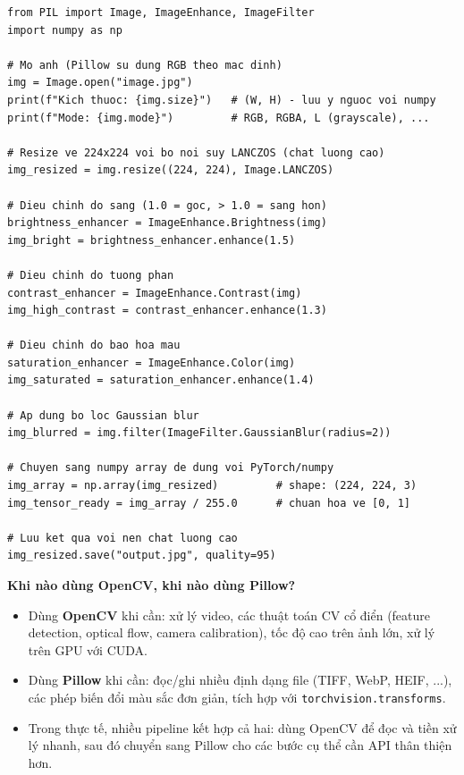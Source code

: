 \begin{verbatim}
from PIL import Image, ImageEnhance, ImageFilter
import numpy as np

# Mo anh (Pillow su dung RGB theo mac dinh)
img = Image.open("image.jpg")
print(f"Kich thuoc: {img.size}")   # (W, H) - luu y nguoc voi numpy
print(f"Mode: {img.mode}")         # RGB, RGBA, L (grayscale), ...

# Resize ve 224x224 voi bo noi suy LANCZOS (chat luong cao)
img_resized = img.resize((224, 224), Image.LANCZOS)

# Dieu chinh do sang (1.0 = goc, > 1.0 = sang hon)
brightness_enhancer = ImageEnhance.Brightness(img)
img_bright = brightness_enhancer.enhance(1.5)

# Dieu chinh do tuong phan
contrast_enhancer = ImageEnhance.Contrast(img)
img_high_contrast = contrast_enhancer.enhance(1.3)

# Dieu chinh do bao hoa mau
saturation_enhancer = ImageEnhance.Color(img)
img_saturated = saturation_enhancer.enhance(1.4)

# Ap dung bo loc Gaussian blur
img_blurred = img.filter(ImageFilter.GaussianBlur(radius=2))

# Chuyen sang numpy array de dung voi PyTorch/numpy
img_array = np.array(img_resized)         # shape: (224, 224, 3)
img_tensor_ready = img_array / 255.0      # chuan hoa ve [0, 1]

# Luu ket qua voi nen chat luong cao
img_resized.save("output.jpg", quality=95)
\end{verbatim}

\begin{mdframed}[style=infobox]
    \textbf{Khi nào dùng OpenCV, khi nào dùng Pillow?}

    \begin{itemize}
        \item Dùng \textbf{OpenCV} khi cần: xử lý video, các thuật toán CV cổ điển (feature detection, optical flow, camera calibration), tốc độ cao trên ảnh lớn, xử lý trên GPU với CUDA.
        \item Dùng \textbf{Pillow} khi cần: đọc/ghi nhiều định dạng file (TIFF, WebP, HEIF, ...), các phép biến đổi màu sắc đơn giản, tích hợp với \texttt{torchvision.transforms}.
        \item Trong thực tế, nhiều pipeline kết hợp cả hai: dùng OpenCV để đọc và tiền xử lý nhanh, sau đó chuyển sang Pillow cho các bước cụ thể cần API thân thiện hơn.
    \end{itemize}
\end{mdframed}

